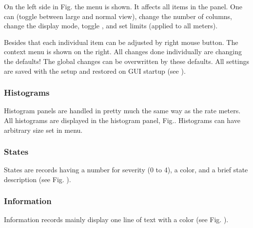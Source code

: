 {On the left side in Fig.  the 
menu is shown. It affects all items in the panel. One can 
(toggle between large and normal view), change the number of
columns, change the display mode, toggle , and set limits
(applied to all meters). 

Besides that each individual item can be
adjusted by right mouse button. The context menu is shown on the right.
All changes done individually are changing the defaults!
The global changes can be overwritten by these defaults.
All settings are saved with the setup and restored on GUI startup
(see ).
\subsubsection{Histograms}
Histogram panels are handled in pretty much the same way as the rate meters.
All histograms are displayed in the histogram panel, Fig.. 
Histograms can have arbitrary size set in  menu.
\subsubsection{States}
States are records having a number for severity (0 to 4), a color,
and a brief state description (see Fig. ).
\subsubsection{Information}
Information records mainly display one line of text with a color
(see Fig. ).
}

